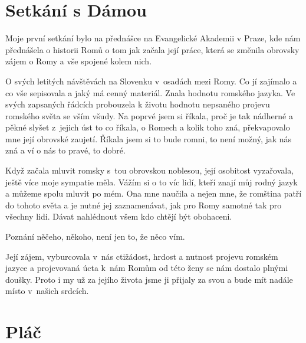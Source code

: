 \section{Setkání s Dámou}

\noindent
Moje první setkání bylo na přednášce na Evangelické Akademii v Praze, kde nám přednášela o historii  Romů o tom jak začala její práce, která se změnila obrovsky zájem o Romy a vše spojené kolem nich. 
 
O svých  letitých návštěvách na Slovenku v osadách mezi Romy. Co jí zajímalo a co vše sepisovala a jaký má cenný materiál. Znala hodnotu romského jazyka. Ve svých zapsaných řádcích probouzela k životu hodnotu nepsaného  projevu romského světa se vším všudy. Na poprvé  jsem si říkala, proč je tak nádherné a pěkné slyšet z jejich úst to co říkala, o Romech a kolik toho zná, překvapovalo mne její obrovské zaujetí.
Říkala jsem si to bude romni, to není možný, jak nás zná a ví o nás to pravé, to dobré.

Když začala mluvit romsky s tou obrovskou noblesou, její osobitost vyzařovala, ještě více moje sympatie měla. Vážím si o to víc lidí, kteří znají můj rodný jazyk a můžeme spolu mluvit po mém. Ona mne naučila a nejen mne, že romština patří do tohoto světa a je nutné jej zaznamenávat,  jak pro Romy samotné tak pro všechny lidi. Dávat nahlédnout všem kdo chtějí být obohaceni.
 
Poznání něčeho, někoho, není jen to, že něco vím.

Její zájem, vyburcovala v nás ctižádost, hrdost a nutnost projevu romském jazyce a projevovaná úcta k nám Romům od této ženy se nám dostalo plnými doušky. Proto i my už  za jejího života jsme ji přijaly za svou  a bude mít nadále místo v našich srdcích.



\section{Pláč}

